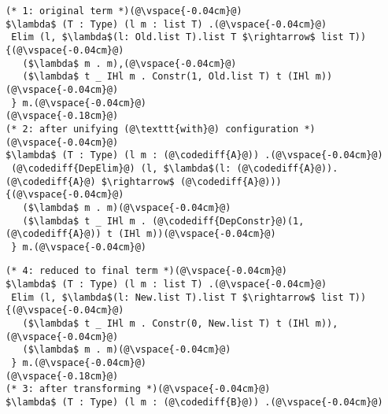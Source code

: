 \begin{figure*}
\begin{minipage}{0.49\textwidth}
\begin{lstlisting}
(* 1: original term *)(@\vspace{-0.04cm}@)
$\lambda$ (T : Type) (l m : list T) .(@\vspace{-0.04cm}@)
 Elim (l, $\lambda$(l: Old.list T).list T $\rightarrow$ list T)) {(@\vspace{-0.04cm}@)
   ($\lambda$ m . m),(@\vspace{-0.04cm}@)
   ($\lambda$ t _ IHl m . Constr(1, Old.list T) t (IHl m))(@\vspace{-0.04cm}@)
 } m.(@\vspace{-0.04cm}@)
(@\vspace{-0.18cm}@)
(* 2: after unifying (@\texttt{with}@) configuration *)(@\vspace{-0.04cm}@)
$\lambda$ (T : Type) (l m : (@\codediff{A}@)) .(@\vspace{-0.04cm}@)
 (@\codediff{DepElim}@) (l, $\lambda$(l: (@\codediff{A}@)).(@\codediff{A}@) $\rightarrow$ (@\codediff{A}@))) {(@\vspace{-0.04cm}@)
   ($\lambda$ m . m)(@\vspace{-0.04cm}@)
   ($\lambda$ t _ IHl m . (@\codediff{DepConstr}@)(1, (@\codediff{A}@)) t (IHl m))(@\vspace{-0.04cm}@)
 } m.(@\vspace{-0.04cm}@)
\end{lstlisting}
\end{minipage}
\hfill
\begin{minipage}{0.49\textwidth}
\begin{lstlisting}
(* 4: reduced to final term *)(@\vspace{-0.04cm}@)
$\lambda$ (T : Type) (l m : list T) .(@\vspace{-0.04cm}@)
 Elim (l, $\lambda$(l: New.list T).list T $\rightarrow$ list T)) {(@\vspace{-0.04cm}@)
   ($\lambda$ t _ IHl m . Constr(0, New.list T) t (IHl m)),(@\vspace{-0.04cm}@)
   ($\lambda$ m . m)(@\vspace{-0.04cm}@)
 } m.(@\vspace{-0.04cm}@)
(@\vspace{-0.18cm}@)
(* 3: after transforming *)(@\vspace{-0.04cm}@)
$\lambda$ (T : Type) (l m : (@\codediff{B}@)) .(@\vspace{-0.04cm}@)

\end{lstlisting}
\end{minipage}
\end{figure*}
